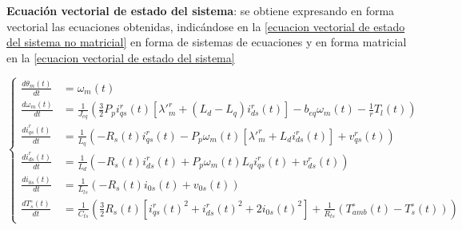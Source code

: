\documentclass[a4paper, 10pt, onecolumn,journal]{ieeeconf}
\begin{document}
\textbf{Ecuación vectorial de estado del sistema}: se obtiene expresando en forma vectorial las ecuaciones obtenidas, indicándose en la \cref{ecuacion vectorial de estado del sistema no matricial}
en forma de sistemas de ecuaciones y en forma matricial en la \cref{ecuacion vectorial de estado del sistema}

\begin{equation}
    \begin{cases} 
        \frac{d \theta_m(t)}{dt}  &= \omega_m(t)\\ 
        \frac{d \omega_m(t)}{dt}  &= \frac{1}{J_{eq}}\left(\frac{3}{2} P_p i^r_{qs}(t)\left[\lambda'^r_m + (L_d - L_q) i^r_{ds}(t) \right] - b_{eq}\omega_m(t) - \frac{1}{r}T_l(t)\right)\\ 
        \frac{d i^r_{qs}(t)}{dt}  &= \frac{1}{L_{q}}\left(-R_s(t) i^r_{qs}(t)- P_p \omega_m(t) \left[\lambda'^r_m + L_d i^r_{ds}(t)\right] + v^r_{qs}(t)\right)\\ 
        \frac{d i^r_{ds}(t)}{dt}  &= \frac{1}{L_{d}}\left(-R_s(t) i^r_{ds}(t) + P_p \omega_m(t) L_q i^r_{qs}(t)  + v^r_{ds}(t)\right)\\ 
        \frac{d i_{0s}(t)}{dt}    &= \frac{1}{L_{ls}}\left(-R_s(t) i_{0s}(t) + v_{0s}(t)\right) \\ 
        \frac{d T^\circ_s(t)}{dt} &= \frac{1}{C_{ts}}\left(\frac{3}{2} R_s(t) \left[ {i^r_{qs}(t)}^2 + {i^r_{ds}(t)}^2 + 2 {i_{0s}(t)}^2 \right] + \frac{1}{R_{ts}}\left(T^{\circ}_{amb}(t) - T_s^{\circ}(t)\right)\right)
    \end{cases}
    \label{ecuacion vectorial de estado del sistema no matricial}
\end{equation}
\end{document}
